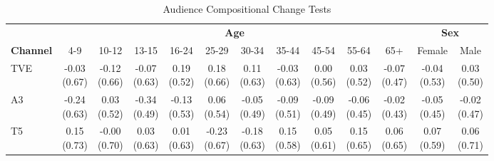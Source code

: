 \documentclass[12pt]{article}
\begin{document}
\begin{table}[!htbp]\centering
	\footnotesize
\caption{Audience Compositional Change Tests}
\label{tab:compositional}
	\begin{threeparttable}
		\begin{tabular}{lcccccccccc|cc}
			\toprule
			& \multicolumn{10}{c}{\textbf{Age}} & \multicolumn{2}{c}{\textbf{Sex}} \\
			\cmidrule(lr){2-11}\cmidrule(lr){12-13}
			\textbf{Channel} & 4-9 & 10-12 & 13-15 & 16-24 & 25-29 & 30-34 & 35-44 & 45-54 & 55-64 & 65+ & Female & Male \\
			\midrule
			TVE & \shortstack{-0.03\\(0.67)} & \shortstack{-0.12\\(0.66)} & \shortstack{-0.07\\(0.63)} & \shortstack{0.19\\(0.52)} & \shortstack{0.18\\(0.66)} & \shortstack{0.11\\(0.63)} & \shortstack{-0.03\\(0.63)} & \shortstack{0.00\\(0.56)} & \shortstack{0.03\\(0.52)} & \shortstack{-0.07\\(0.47)} & \shortstack{-0.04\\(0.53)} & \shortstack{0.03\\(0.50)} \\
			A3 & \shortstack{-0.24\\(0.63)} & \shortstack{0.03\\(0.52)} & \shortstack{-0.34\\(0.49)} & \shortstack{-0.13\\(0.53)} & \shortstack{0.06\\(0.54)} & \shortstack{-0.05\\(0.49)} & \shortstack{-0.09\\(0.51)} & \shortstack{-0.09\\(0.49)} & \shortstack{-0.06\\(0.45)} & \shortstack{-0.02\\(0.43)} & \shortstack{-0.05\\(0.45)} & \shortstack{-0.02\\(0.47)} \\
			T5 & \shortstack{0.15\\(0.73)} & \shortstack{-0.00\\(0.70)} & \shortstack{0.03\\(0.63)} & \shortstack{0.01\\(0.63)} & \shortstack{-0.23\\(0.67)} & \shortstack{-0.18\\(0.63)} & \shortstack{0.15\\(0.58)} & \shortstack{0.05\\(0.61)} & \shortstack{0.15\\(0.65)} & \shortstack{0.06\\(0.65)} & \shortstack{0.07\\(0.59)} & \shortstack{0.06\\(0.71)} \\

\end{tabular}
\end{threeparttable}
\end{table}
\end{document}
